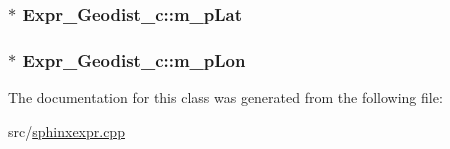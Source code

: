 \hypertarget{classExpr__Geodist__c_a3a2beae2806acc87e14c02c6b5e57105}{
\subsubsection[{m\-\_\-p\-Lat}]{$\ast$ Expr\-\_\-\-Geodist\-\_\-c\-::m\-\_\-p\-Lat\hspace{0.3cm}{\ttfamily [private]}}}\label{classExpr__Geodist__c_a3a2beae2806acc87e14c02c6b5e57105}
\hypertarget{classExpr__Geodist__c_a668b71adc439b6ad94597f2815a1aadb}{
\subsubsection[{m\-\_\-p\-Lon}]{$\ast$ Expr\-\_\-\-Geodist\-\_\-c\-::m\-\_\-p\-Lon\hspace{0.3cm}{\ttfamily [private]}}}\label{classExpr__Geodist__c_a668b71adc439b6ad94597f2815a1aadb}


The documentation for this class was generated from the following file\-:\begin{DoxyCompactItemize}
\item 
src/\hyperlink{sphinxexpr_8cpp}{sphinxexpr.\-cpp}\end{DoxyCompactItemize}
